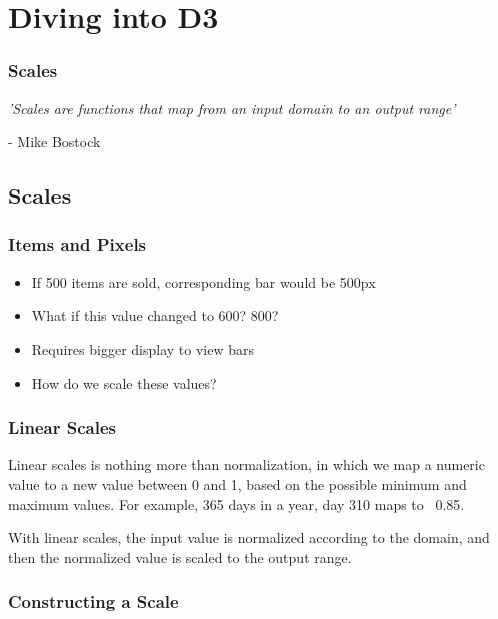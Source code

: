 \documentclass[red]{beamer}
\begin{document}
\section[Outline]{}

\section{Diving into D3}

\begin{frame}
    \frametitle{Scales}
    \textit{'Scales are functions that map from an input domain to an output range'}
    \newline

    \hspace{5.9cm} - Mike Bostock 
\end{frame}


\subsection{Scales}

\begin{frame}
  \frametitle{Items and Pixels}   %
  \lstl

  \begin{itemize}
  \item<1-> If 500 items are sold, corresponding bar would be 500px
  \item<2-> What if this value changed to 600? 800?
  \item<3-> Requires bigger display to view bars
  \item<4-> How do we scale these values?
  \end{itemize}
\end{frame}

\begin{frame}
  \frametitle{Linear Scales}
  Linear scales is nothing more than normalization, in which we map a numeric value to a 
  new value between 0 and 1, based on the possible minimum and maximum values. For example, 
  365 days in a year, day 310 maps to ~0.85. 
  \newline

  With linear scales, the input value is normalized according to the domain, and then the 
  normalized value is scaled to the output range. 
\end{frame}

\begin{frame}
  \frametitle{Constructing a Scale}
  \lstll
\end{frame}
\end{document}

